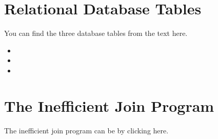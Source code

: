 \documentclass[letterpaper,10pt,english]{sphinxmanual}
\begin{document}
\section{Relational Database Tables}
\label{\detokenize{chap10/chap10:relational-database-tables}}
You can find the three database tables from the text here.
\begin{itemize}
\item {} 

\item {} 

\item {} 

\end{itemize}


\section{The Inefficient Join Program}
\label{\detokenize{chap10/chap10:the-inefficient-join-program}}
The inefficient join program can be  by clicking here.
\end{document}
